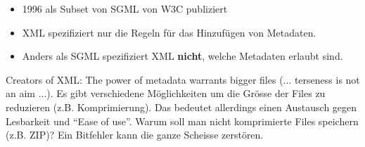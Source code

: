 \begin{itemize}
\item 1996 als Subset von SGML von W3C publiziert
\item XML spezifiziert nur die Regeln für das Hinzufügen von Metadaten.
\item Anders als SGML spezifiziert XML \textbf{nicht}, welche Metadaten erlaubt sind.
\end{itemize}

Creators of XML: The power of metadata warrants bigger files (... terseness is not an aim ...).
Es gibt verschiedene Möglichkeiten um die Grösse der Files zu reduzieren (z.B. Komprimierung).
Das bedeutet allerdings einen Austausch gegen Lesbarkeit und "`Ease of use"'.
Warum soll man nicht komprimierte Files speichern (z.B. ZIP)? Ein Bitfehler kann die ganze Scheisse zerstören.